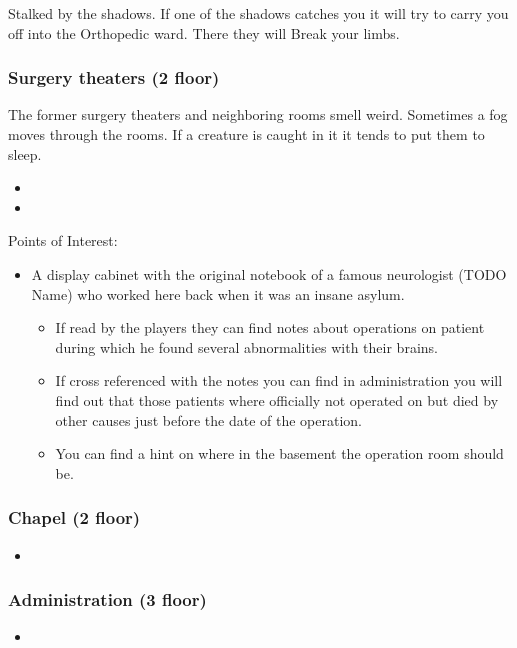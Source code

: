 \documentclass[11pt]{article}
\begin{document}
{Stalked by the shadows. If one of the shadows catches you it will try to carry you off into the Orthopedic ward. There they will Break your limbs.
\subsubsection{Surgery theaters (2 floor)}
\label{sec:org8b87b32}
The former surgery theaters and neighboring rooms smell weird. Sometimes a fog moves through the rooms. If a creature is caught in it it tends to put them to sleep.

\begin{itemize}
\item {}
\item {}
\end{itemize}

Points of Interest:
\begin{itemize}
\item A display cabinet with the original notebook of a famous neurologist (TODO Name) who worked here back when it was an insane asylum.
\begin{itemize}
\item If read by the players they can find notes about operations on patient during which he found several abnormalities with their brains.
\item If cross referenced with the notes you can find in administration you will find out that those patients where officially not operated on but died by other causes just before the date of the operation.
\item You can find a hint on where in the basement the operation room should be.
\end{itemize}
\end{itemize}
\subsubsection{Chapel (2 floor)}
\label{sec:orgb55148d}

\begin{itemize}
\item {}
\end{itemize}
\subsubsection{Administration (3 floor)}
\label{sec:org91e9031}

\begin{itemize}
\item {}
\end{itemize}

}
\end{document}
